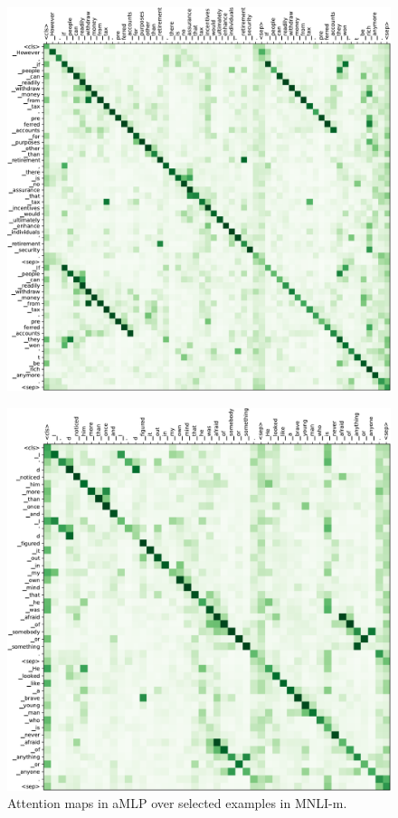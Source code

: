 \documentclass{article}
\begin{document}
\begin{figure}[h]
    \centering
    \includegraphics[width=0.73\linewidth]{figures/amlp-heatmap-1.pdf}
\end{figure}

\begin{figure}[h]
    \centering
    \includegraphics[width=0.73\linewidth]{figures/amlp-heatmap-2.pdf}
    \caption{Attention maps in aMLP over selected examples in MNLI-m.}
\end{figure}
    
\end{document}
